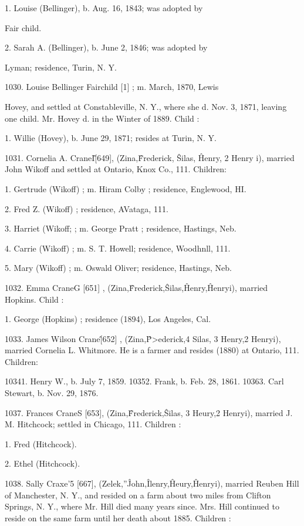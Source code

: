 1. Louise (Bellinger), b. Aug. 16, 1843; was adopted by 

Fair child. 

2. Sarah A. (Bellinger), b. June 2, 1846; was adopted by 

Lyman; residence, Turin, N. Y. 

1030. Louise Bellinger Fairchild [1] ; m. March, 1870, Lewis 

Hovey, and settled at Constableville, N. Y., where she d. 
Nov. 3, 1871, leaving one child. Mr. Hovey d. in the Winter 
of 1889. Child : 

1. Willie (Hovey), b. June 29, 1871; resides at Turin, 
N. Y. 

1031. Cornelia A. CraneI\^ [649], (Zina,\^ Frederick, \^ Silas, \^ 
Henry, 2 Henry i), married John Wikoff and settled at Ontario, 
Knox Co., 111. Children: 

1. Gertrude (Wikoff) ; m. Hiram Colby ; residence, Englewood, HI. 

2. Fred Z. (Wikoff) ; residence, AVataga, 111. 

3. Harriet (Wikoff; ; m. George Pratt ; residence, Hastings, Neb. 

4. Carrie (Wikoff) ; m. S. T. Howell; residence, Woodhnll, 111. 

5. Mary (Wikoff) ; m. Oswald Oliver; residence, Hastings, Neb. 

1032. Emma CraneG [651] , (Zina,\^ Frederick,\^ Silas,\^ Henry,\^ 
Henryi), married Hopkins. Child : 

1. George (Hopkins) ; residence (1894), Los Angeles, Cal. 

1033. James Wilson Crane\^ [652] , (Zina,\^ P>ederick,4 Silas, 3 
Henry,2 Henryi), married Cornelia L. Whitmore. He is a farmer 
and resides (1880) at Ontario, 111. Children: 

10341. Henry W., b. July 7, 1859. 
10352. Frank, b. Feb. 28, 1861. 
10363. Carl Stewart, b. Nov. 29, 1876. 




1037. Frances CraneS [653], (Zina,\^ Frederick,\^ Silas, 3 
Heury,2 Henryi), married J. M. Hitchcock; settled in Chicago, 
111. Children : 

1. Fred (Hitchcock). 

2. Ethel (Hitchcock). 

1038. Sally Craxe'5 [667], (Zelek,''\^ John,\^ Ilenry,\^ Heury,\^ 
Henryi), married Reuben Hill of Manchester, N. Y., and resided 
on a farm about two miles from Clifton Springs, N. Y., where 
Mr. Hill died many years since. Mrs. Hill continued to reside 
on the same farm until her death about 1885. Children : 

